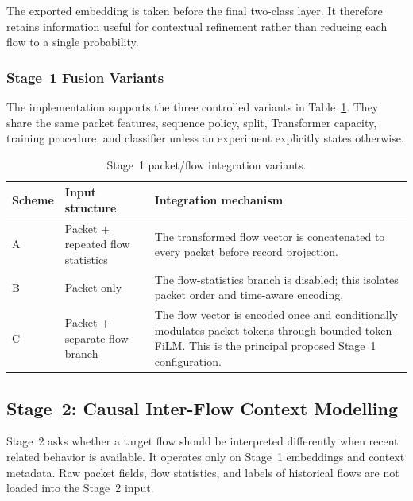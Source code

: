 The exported embedding is taken before the final two-class layer. It therefore
retains information useful for contextual refinement rather than reducing each
flow to a single probability.

\subsubsection{Stage~1 Fusion Variants}
\label{subsubsec:stage1_variants}

The implementation supports the three controlled variants in
Table~\ref{tab:stage1_fusion_variants}. They share the same packet features,
sequence policy, split, Transformer capacity, training procedure, and classifier
unless an experiment explicitly states otherwise.

\begin{table}[t]
    \centering
    \caption{Stage~1 packet/flow integration variants.}
    \label{tab:stage1_fusion_variants}
    \small
    \begin{tabular}{@{}p{1.1cm}p{3.1cm}p{8.9cm}@{}}
        \toprule
        Scheme & Input structure & Integration mechanism \\
        \midrule
        A & Packet + repeated flow statistics & The transformed flow vector is
        concatenated to every packet before record projection. \\
        B & Packet only & The flow-statistics branch is disabled; this isolates
        packet order and time-aware encoding. \\
        C & Packet + separate flow branch & The flow vector is encoded once and
        conditionally modulates packet tokens through bounded token-FiLM. This
        is the principal proposed Stage~1 configuration. \\
        \bottomrule
    \end{tabular}
\end{table}

\subsection{Stage~2: Causal Inter-Flow Context Modelling}
\label{subsec:method_stage2}

Stage~2 asks whether a target flow should be interpreted differently when
recent related behavior is available. It operates only on Stage~1 embeddings
and context metadata. Raw packet fields, flow statistics, and labels of
historical flows are not loaded into the Stage~2 input.

